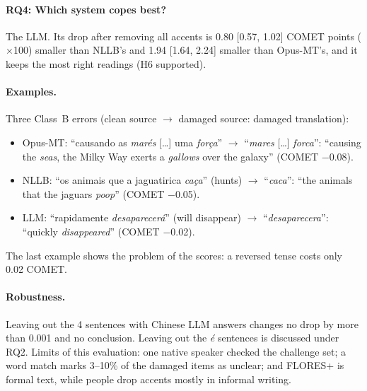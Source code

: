 \paragraph{RQ4: Which system copes best?} The LLM. Its drop after removing all accents is 0.80 [0.57,
1.02] COMET points ($\times$100) smaller than NLLB's and 1.94 [1.64, 2.24] smaller than Opus-MT's, and
it keeps the most right readings (H6 supported).

\paragraph{Examples.} Three Class~B errors (clean source $\rightarrow$ damaged source: damaged translation):
\begin{itemize}\itemsep0pt
\item Opus-MT: ``causando as \emph{marés} [\ldots] uma \emph{força}'' $\rightarrow$ ``\emph{mares}
[\ldots] \emph{forca}'': ``causing the \emph{seas}, the Milky Way exerts a \emph{gallows} over the
galaxy'' (COMET $-$0.08).
\item NLLB: ``os animais que a jaguatirica \emph{caça}'' (hunts) $\rightarrow$ ``\emph{caca}'': ``the
animals that the jaguars \emph{poop}'' (COMET $-$0.05).
\item LLM: ``rapidamente \emph{desaparecerá}'' (will disappear) $\rightarrow$ ``\emph{desaparecera}'':
``quickly \emph{disappeared}'' (COMET $-$0.02).
\end{itemize}
The last example shows the problem of the scores: a reversed tense costs only 0.02 COMET.

\paragraph{Robustness.} Leaving out the 4 sentences with Chinese LLM answers changes
no drop by more than 0.001 and no conclusion. Leaving out the \emph{é} sentences is discussed under RQ2. Limits of this
evaluation: one native speaker checked the challenge set; a word match marks 3--10\% of the damaged
items as unclear; and FLORES+ is formal text, while people drop accents mostly in informal writing.
